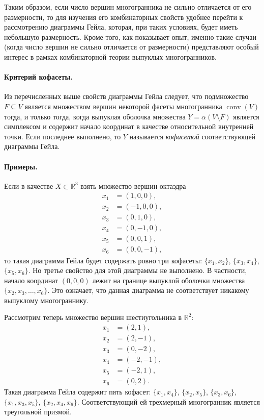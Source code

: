 \documentclass[12pt]{article}
\newcommand{\R}{\mathbb{R}}
\DeclareMathOperator{\conv}{conv}
\begin{document}
Таким образом, если число вершин многогранника не сильно отличается от его размерности, то для изучения его комбинаторных свойств удобнее перейти к рассмотрению диаграммы Гейла, которая, при таких условиях, будет иметь небольшую размерность. Кроме того, как показывает опыт, именно такие случаи (когда число вершин не сильно отличается от размерности) представляют особый интерес в рамках комбинаторной теории выпуклых многогранников. 

\paragraph{Критерий кофасеты.}
Из перечисленных выше свойств диаграммы Гейла следует, что 
подмножество $F \subseteq V$ является множеством вершин некоторой фасеты многогранника $\conv(V)$ тогда, и только тогда, когда выпуклая оболочка множества $Y = \alpha(V \setminus F)$ является симплексом и содержит начало координат в качестве относительной внутренней точки.
Если последнее выполнено, то $Y$ называется \emph{кофасетой} соответствующей диаграммы Гейла.


\paragraph{Примеры.}
Если в качестве $X\subset \R^3$ взять множество вершин октаэдра
\[
\begin{aligned}
x_1 &= (1, 0, 0), \\
x_2 &= (-1, 0, 0), \\
x_3 &= (0, 1, 0), \\
x_4 &= (0, -1, 0), \\
x_5 &= (0, 0, 1), \\
x_6 &= (0, 0, -1), 
\end{aligned}
\]
то такая диаграмма Гейла будет содержать ровно три кофасеты: $\{x_1, x_2\}$, $\{x_3, x_4\}$, $\{x_5, x_6\}$.
Но третье свойство для этой диаграммы не выполнено.
В частности, начало координат $(0, 0, 0)$ лежит на границе выпуклой оболочки множества $\{x_2, x_3, \dots, x_6\}$.
Это означает, что данная диаграмма не соответствует никакому выпуклому многограннику.

Рассмотрим теперь множество вершин шестиугольника в $\R^2$: 
\[
\begin{aligned}
x_1 &= (2,  1), \\
x_2 &= (2, -1), \\
x_3 &= (0, -2), \\
x_4 &= (-2, -1), \\
x_5 &= (-2,  1), \\
x_6 &= (0, 2).
\end{aligned}
\]
Такая диаграмма Гейла содержит пять кофасет:
$\{x_1, x_4\}$, $\{x_2, x_5\}$, $\{x_3, x_6\}$, $\{x_1, x_3, x_5\}$, $\{x_2, x_4, x_6\}$. Соответствующий ей трехмерный многогранник является треугольной призмой.
\end{document}
